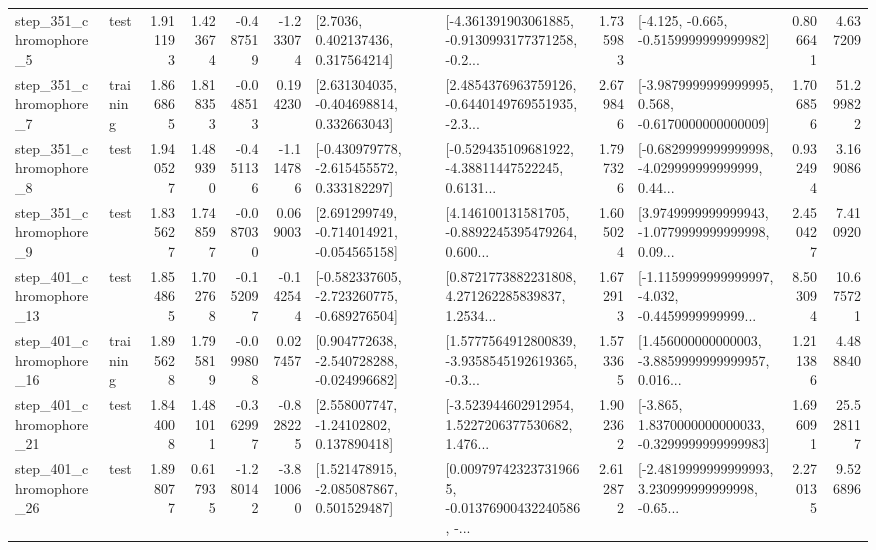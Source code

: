 \begin{tabular}{llrrrrllrlrr}
   step\_351\_chromophore\_5 &      test &      1.911193 &    1.423674 &     -0.487519 & -1.233074 &          [2.7036, 0.402137436, 0.317564214] &  [-4.361391903061885, -0.9130993177371258, -0.2... &       1.735983 &              [-4.125, -0.665, -0.5159999999999982] &            0.806641 &          4.637209 \\
   step\_351\_chromophore\_7 &  training &      1.866865 &    1.818353 &     -0.048513 &  0.194230 &    [2.631304035, -0.404698814, 0.332663043] &  [2.4854376963759126, -0.6440149769551935, -2.3... &       2.679846 &  [-3.9879999999999995, 0.568, -0.6170000000000009] &            1.706856 &         51.299822 \\
   step\_351\_chromophore\_8 &      test &      1.940527 &    1.489390 &     -0.451136 & -1.114786 &   [-0.430979778, -2.615455572, 0.333182297] &  [-0.529435109681922, -4.38811447522245, 0.6131... &       1.797326 &  [-0.6829999999999998, -4.029999999999999, 0.44... &            0.932494 &          3.169086 \\
   step\_351\_chromophore\_9 &      test &      1.835627 &    1.748597 &     -0.087030 &  0.069003 &   [2.691299749, -0.714014921, -0.054565158] &  [4.146100131581705, -0.8892245395479264, 0.600... &       1.605024 &  [3.9749999999999943, -1.0779999999999998, 0.09... &            2.450427 &          7.410920 \\
  step\_401\_chromophore\_13 &      test &      1.854865 &    1.702768 &     -0.152097 & -0.142544 &  [-0.582337605, -2.723260775, -0.689276504] &  [0.8721773882231808, 4.271262285839837, 1.2534... &       1.672913 &  [-1.1159999999999997, -4.032, -0.4459999999999... &            8.503094 &         10.675721 \\
  step\_401\_chromophore\_16 &  training &      1.895628 &    1.795819 &     -0.099808 &  0.027457 &   [0.904772638, -2.540728288, -0.024996682] &  [1.5777564912800839, -3.9358545192619365, -0.3... &       1.573365 &  [1.456000000000003, -3.8859999999999957, 0.016... &            1.211386 &          4.488840 \\
  step\_401\_chromophore\_21 &      test &      1.844008 &    1.481011 &     -0.362997 & -0.828225 &     [2.558007747, -1.24102802, 0.137890418] &  [-3.523944602912954, 1.5227206377530682, 1.476... &       1.902362 &  [-3.865, 1.8370000000000033, -0.3299999999999983] &            1.696091 &         25.528117 \\
  step\_401\_chromophore\_26 &      test &      1.898077 &    0.617935 &     -1.280142 & -3.810060 &    [1.521478915, -2.085087867, 0.501529487] &  [0.009797423237319665, -0.01376900432240586, -... &       2.612872 &  [-2.4819999999999993, 3.230999999999998, -0.65... &            2.270135 &          9.526896 \\

\end{tabular}
